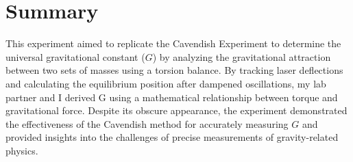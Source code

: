 \documentclass[a4paper,12pt,english]{all-in-one} %
\begin{document}
\section*{Summary}
{
This experiment aimed to replicate the Cavendish Experiment to determine the universal gravitational constant ($G$) by analyzing the gravitational attraction between two sets of masses using a torsion balance. By tracking laser deflections and calculating the equilibrium position after dampened oscillations, my lab partner and I derived G using a mathematical relationship between torque and gravitational force. Despite its obscure appearance, the experiment demonstrated the effectiveness of the Cavendish method for accurately measuring 
$G$ and provided insights into the challenges of precise measurements of gravity-related physics.
}
\end{document}
